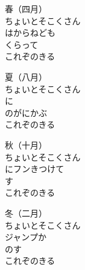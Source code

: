 \documentclass[10pt,b5j]{tarticle} %
\begin{document}
\begin{enumerate} %
    \setlength{\itemindent}{\itemmargin}
    \begin{minipage}[c]{\blocksize}

        \vspace{\linespace}
        \item [春（四月）]~\\
        ちょいとそこくさん\\
        はからねども\\
        くらって\\
        これぞのきる
        
        \vspace{\linespace}
        \item [夏（八月）]~\\
        ちょいとそこくさん\\
        に\\
        のがにかぶ\\
        これぞのきる
        
    \end{minipage}
    \begin{minipage}[c]{\blocksize}

        \vspace{\linespace}
        \item [秋（十月）] ~\\
        ちょいとそこくさん\\
        にフンきつけて\\
        す\\
        これぞのきる
        
        \vspace{\linespace}
        \item [冬（二月）]~\\
        ちょいとそこくさん\\
        ジャンプか\\
        のす\\
        これぞのきる
        

\end{minipage}
\end{enumerate}
\end{document}
